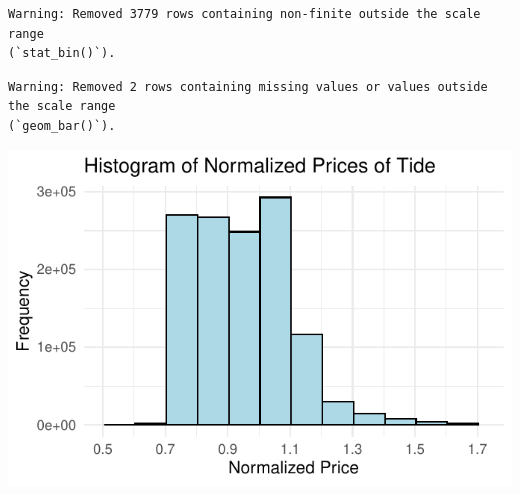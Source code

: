 \documentclass[
]{article}
\begin{document}
\begin{verbatim}
Warning: Removed 3779 rows containing non-finite outside the scale range
(`stat_bin()`).
\end{verbatim}

\begin{verbatim}
Warning: Removed 2 rows containing missing values or values outside the scale range
(`geom_bar()`).
\end{verbatim}

\begin{flushright}\includegraphics{Base-Pricing_files/figure-latex/unnamed-chunk-17-1} \end{flushright}
\end{document}
